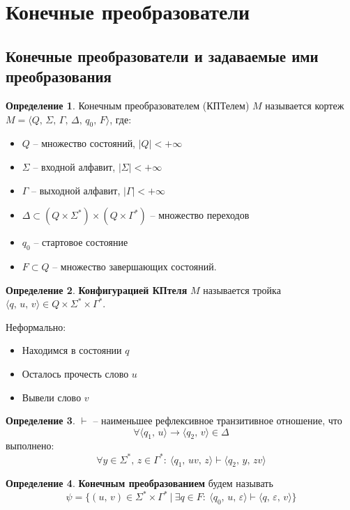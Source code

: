 \documentclass[a4paper,12pt]{article}
\theoremstyle{plain}
\theoremstyle{definition}
\newtheorem{definition}{Определение}[subsection]
\theoremstyle{remark}
\begin{document}
\section{Конечные преобразователи}
\subsection{Конечные преобразователи и задаваемые ими преобразования}
\begin{definition}
	Конечным преобразователем (КПТелем) $M$ называется кортеж $M = \langle Q,\,\Sigma,\,\Gamma,\,\Delta,\, q_0,\, F\rangle$, где:
	\begin{itemize}
		\item $Q$ -- множество состояний, $\vert Q\vert < +\infty$
		\item $\Sigma$ -- входной алфавит, $\vert \Sigma\vert < +\infty$
		\item $\Gamma$ -- выходной алфавит, $\vert \Gamma\vert < +\infty$
		\item $\Delta \subset (Q \times \Sigma^*) \times (Q \times \Gamma^*)$ -- множество переходов
		\item $q_0$ -- стартовое состояние
		\item $F \subset Q$ -- множество завершающих состояний.
	\end{itemize}
\end{definition}

\begin{definition}
	\textbf{Конфигурацией КПтеля} $M$ называется тройка $\langle q,\,u,\,v\rangle \in Q \times \Sigma^* \times \Gamma^*$.

	Неформально:
	\begin{itemize}
		\item Находимся в состоянии $q$
		\item Осталось прочесть слово $u$
		\item Вывели слово $v$
	\end{itemize}
\end{definition}

\begin{definition}
	$\vdash$ -- наименьшее рефлексивное транзитивное отношение, что
	\[
		\forall \langle q_1,\,u\rangle \to\langle q_2,\, v\rangle \in \Delta
	\]
	выполнено:
	\[
		\forall y \in \Sigma^*,\, z \in \Gamma^* :\: \langle q_1,\, uv,\,z\rangle\vdash\langle q_2,\,y,\,zv\rangle
	\]
\end{definition}

\begin{definition}
	\textbf{Конечным преобразованием} будем называть
	\[
		\psi = \{(u,\,v) \in \Sigma^*\times\Gamma^* \:\vert\: \exists q \in F :\: \langle q_0,\,u,\,\varepsilon\rangle \vdash \langle q,\,\varepsilon,\,v\rangle\}
	\]
\end{definition}
\end{document}
